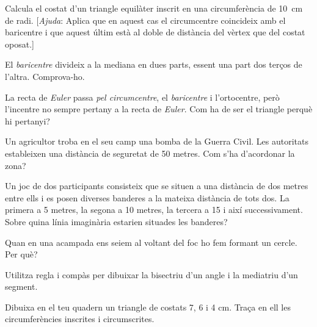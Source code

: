 \begin{mylist}
	
	\exer  Calcula el costat d'un triangle equilàter inscrit en una circumferència de 10~cm de radi. [\textit{Ajuda}: Aplica que en aquest cas el circumcentre coincideix amb el baricentre i que aquest últim està al doble de distància del vèrtex que del costat oposat.] 
	
	
	\exer \ggb El \textit{baricentre} divideix a la mediana en dues parts, essent una part dos terços de l'altra. Comprova-ho.
	
	
	\exer \simbolsearch La recta de \textit{Euler} passa \textit{pel circumcentre}, el \textit{baricentre} i l'ortocentre, però l'incentre no sempre pertany a la recta de \textit{Euler}. Com ha de ser el triangle perquè hi pertanyi? 
		
 
	\exer  Un agricultor troba en el seu camp una bomba de la Guerra Civil. Les autoritats estableixen una distància de seguretat de 50 metres. Com s'ha d'acordonar la zona?
	
	
	\exer  Un joc de dos participants consisteix que se situen a una distància de dos metres entre ells i es posen diverses banderes a la mateixa distància de tots dos. La primera a 5 metres, la segona a 10 metres, la tercera a 15 i així successivament. Sobre quina línia imaginària estarien situades les banderes?
	
	
	
	
	\exer  Quan en una acampada ens seiem al voltant del foc ho fem formant un cercle. Per què?
	
	 
	
	\exer  Utilitza regla i compàs per dibuixar la bisectriu d'un angle i la mediatriu d'un segment.
	
	
	\exer  Dibuixa en el teu quadern un triangle de costats 7, 6 i 4 cm. Traça en ell les circumferències inscrites i circumscrites.
	
	

\end{mylist}
